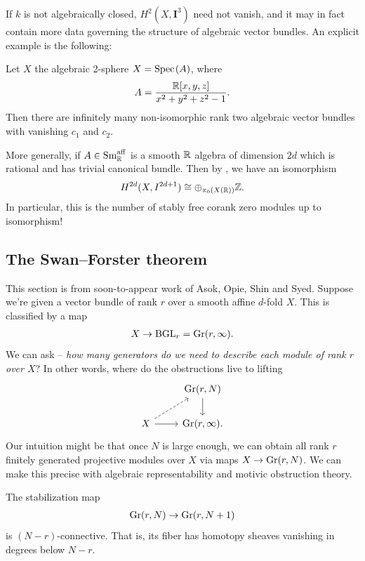 \documentclass[11pt,openany]{book}
\providecommand{\aff}{\mathrm{aff}}
\begin{document}
If $k$ is not algebraically closed, $H^2(X,\mathbf{I}^3)$ need not vanish, and it may in fact contain more data governing the structure of algebraic vector bundles. An explicit example is the following:

\begin{example}
\label{exa:stably-free-corank-zero-algebraic-S2}
Let $X$ the algebraic 2-sphere $X=\text{Spec}\hspace{0.1em}(A)$, where
\begin{align*}
    A = \frac{\mathbb{R}[x,y,z]}{x^2 + y^2 + z^2 - 1}.
\end{align*}
Then there are infinitely many non-isomorphic rank two algebraic vector bundles with vanishing $c_1$ and $c_2$.
\end{example}

More generally, if $A\in \Sm_\R^\aff$ is a smooth $\mathbb{R}$ algebra of dimension $2d$ which is rational and has trivial canonical bundle. Then by \cite{Fasel-unim}, we have an isomorphism
\begin{align*}
    H^{2d}(X, I^{2d+1}) \cong \oplus_{\pi_0(X(\mathbb{R}))}\mathbb{Z}.
\end{align*}
In particular, this is the number of stably free corank zero modules up to isomorphism!



\subsection{The Swan--Forster theorem}

This section is from soon-to-appear work of Asok, Opie, Shin and Syed. Suppose we're given a vector bundle of rank $r$ over a smooth affine $d$-fold $X$. This is classified by a map
\begin{align*}
    X \to \mathrm{BGL}_r = \mathrm{Gr}(r,\infty).
\end{align*}
%
We can ask -- \textit{how many generators do we need to describe each module of rank $r$ over $X$}? In other words, where do the obstructions live to lifting
\[ \begin{tikzcd}
     & {\Gr(r,N)}\dar\\
    X\rar\ar[ur,dashed] & {\Gr(r,\infty)}.
\end{tikzcd} \]
%
Our intuition might be that once $N$ is large enough, we can obtain all rank $r$ finitely generated projective modules over $X$ via maps $X \to \mathrm{Gr}(r,N)$. We can make this precise with algebraic representability and motivic obstruction theory.

\begin{proposition} The stabilization map
\begin{align*}
    \mathrm{Gr}(r,N) \to \mathrm{Gr}(r,N+1)
\end{align*}
is $(N-r)$-connective. That is, its fiber has homotopy sheaves vanishing in degrees below $N-r$.
\end{proposition}
\end{document}

